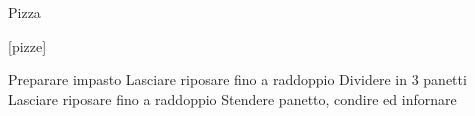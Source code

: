 \begin{recipe}{Pizza}
    \begin{header}
        [pizze]
    
    \end{header}
    
    \begin{ingredients}
    \end{ingredients}
    
    \begin{preparation}
        \step Preparare impasto
        \step Lasciare riposare fino a raddoppio
        \step Dividere in 3 panetti
        \step Lasciare riposare fino a raddoppio
        \step Stendere panetto, condire ed infornare
    \end{preparation}
\end{recipe}

